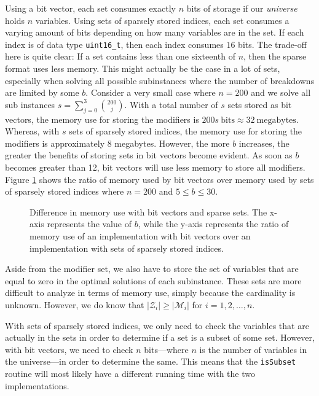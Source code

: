 Using a bit vector, each set consumes exactly $n$ bits of storage if our
\emph{universe} holds $n$ variables.
Using sets of sparsely stored indices, each set consumes a varying amount of
bits depending on how many variables are in the set. If each index is of data
type \texttt{uint16\_t}, then each index consumes $16$ bits. The trade-off
here is quite clear: If a set contains less than one sixteenth of $n$, then
the sparse format uses less memory. This might actually be the case in a lot
of sets, especially when solving all possible subinstances where the number
of breakdowns are limited by some $b$. Consider a very small case where
$n = 200$ and we solve all sub instances $s = \sum_{j=0}^{3} {\binom{200}{j}}$.
With a total number of $s$ sets stored as bit vectors, the memory use for
storing the modifiers is $200s~\textrm{bits} \approx 32~\textrm{megabytes}$.
Whereas, with $s$ sets of sparsely stored indices, the memory use for storing
the modifiers is approximately $8$ megabytes. However, the more $b$ increases,
the greater the benefits of storing sets in bit vectors become evident. As soon
as $b$ becomes greater than 12, bit vectors will use less memory to store all
modifiers. Figure \ref{fig:bmem} shows the ratio of memory used by bit vectors
over memory used by sets of sparsely stored indices where $n = 200$ and
$5 \leq b \leq 30$.
\begin{figure}[ht!]
\centering

\caption{Difference in memory use with bit vectors and sparse sets.
         The x-axis represents the value of $b$, while the y-axis represents
         the ratio of memory use of an implementation with bit vectors over
         an implementation with sets of sparsely stored indices.}
\label{fig:bmem}
\end{figure}
Aside from the modifier set, we also have to store the set of variables that
are equal to zero in the optimal solutions of each subinstance. These sets
are more difficult to analyze in terms of memory use, simply because the
cardinality is unknown. However, we do know that $|\mathcal{Z}_i| \geq
|\mathcal{M}_i|$ for $i=1,2,\ldots,n$.

With sets of sparsely stored indices, we only need to check the variables
that are actually in the sets in order to determine if a set is a subset
of some set. However, with bit vectors, we need to check $n$ bits---where $n$
is the number of variables in the universe---in order to determine the same.
This means that the \texttt{isSubset} routine will most likely have a different
running time with the two implementations.

